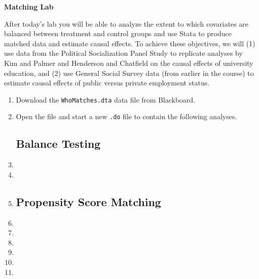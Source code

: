 \documentclass[a4paper,12pt]{article}
\begin{document}
\begin{center}
\textbf{Matching Lab}
\end{center}

After today's lab you will be able to analyze the extent to which covariates are balanced between treatment and control groups and use Stata to produce matched data and estimate causal effects. To achieve these objectives, we will (1) use data from the Political Socialization Panel Study to replicate analyses by Kim and Palmer and Henderson and Chatfield on the causal effects of university education, and (2) use General Social Survey data (from earlier in the course) to estimate causal effects of public versus private employment status.

\begin{enumerate}\itemsep0.5em

\item Download the \texttt{WhoMatches.dta} data file from Blackboard.
\item Open the file and start a new \texttt{.do} file to contain the following analyses.

\subsection*{Balance Testing}


\item %
\item %
\item %


\subsection*{Propensity Score Matching}


\item %
\item %

\item %
\item %
\item %

\item %


\end{enumerate}
\end{document}
